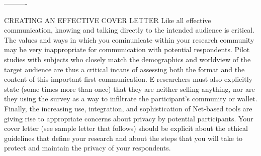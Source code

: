 \documentclass{beamer}
\begin{document}
----------
\begin{frame}{CREATING AN EFFECTIVE COVER LETTER}
Like all effective communication, knowing and talking directly to the intended audience is critical. The values and ways in which you cominunicate within your research community may be very inappropriate for communication with potential respondents. Pilot studies with subjects who closely match the demographics and worldview of the target audience are thus a critical incans of assessing both the format and the content of this important first communication. E-researchers must also explicitly state (some times more than once) that they are neither selling anything, nor are they using the survey as a way to infiltrate the participant's community or wallet. 
Finally, the increasing use, integration, and sophistication of Net-based tools are giving rise to appropriate concerns about privacy by potential participants. Your cover letter (see sample letter that follows) should be 
explicit about the ethical guidelines that define your research and about the steps that you will take to protect and maintain the privacy of your respondents. 
\end{frame}
\end{document}

